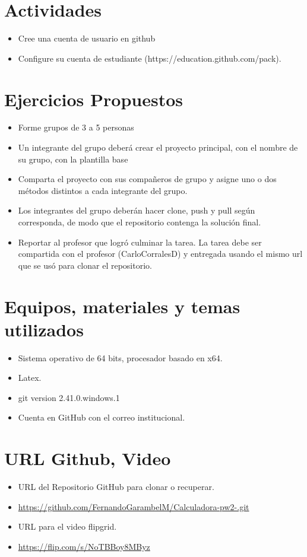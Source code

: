 \documentclass{article}
\begin{document}
	\section{Actividades}
	\begin{itemize}		
		\item Cree una cuenta de usuario en github
		\item Configure su cuenta de estudiante (https://education.github.com/pack).
	\end{itemize}
\section{Ejercicios Propuestos}
	\begin{itemize}		
		\item Forme grupos de 3 a 5 personas
		\item Un integrante del grupo deberá crear el proyecto principal, con el nombre de su grupo, con la plantilla base
		\item Comparta el proyecto con sus compañeros de grupo y asigne uno o dos  métodos distintos a cada integrante del grupo.
		\item Los integrantes del grupo deberán hacer clone, push y pull según corresponda, de modo que el repositorio contenga la solución final.
		\item Reportar al profesor que logró culminar la tarea. La tarea debe ser compartida con el profesor (CarloCorralesD) y entregada usando el mismo url que se usó para clonar el repositorio.
	\end{itemize}

	\section{Equipos, materiales y temas utilizados}
	\begin{itemize}
		\item Sistema operativo de 64 bits, procesador basado en x64.
		\item Latex. 
		\item git version 2.41.0.windows.1
		\item Cuenta en GitHub con el correo institucional.
	\end{itemize}
	\section{URL Github, Video}
	\begin{itemize}
		\item URL del Repositorio GitHub para clonar o recuperar.
		\item \url{https://github.com/FernandoGarambelM/Calculadora-pw2-.git}
		\item URL para el video flipgrid.
		\item \url{https://flip.com/s/NoTBBoy8MByz}	
	\end{itemize}
	\clearpage
\end{document}
